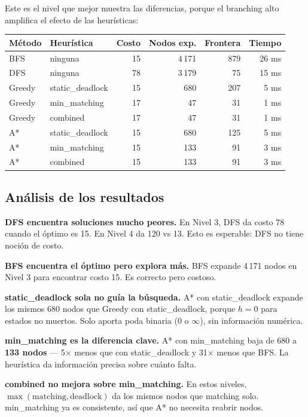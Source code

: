 \documentclass[12pt, a4paper]{article}
\begin{document}
Este es el nivel que mejor muestra las diferencias, porque el branching alto amplifica el efecto de las heurísticas:

\begin{center}
\small
\begin{tabular}{llrrrr}
\toprule
\textbf{Método} & \textbf{Heurística} & \textbf{Costo} & \textbf{Nodos exp.} & \textbf{Frontera} & \textbf{Tiempo} \\
\midrule
BFS     & ninguna          & 15  & 4\,171 & 879 & 26 ms \\
DFS     & ninguna          & 78  & 3\,179 & 75  & 15 ms \\
Greedy  & static\_deadlock & 15  & 680    & 207 & 5 ms \\
Greedy  & min\_matching    & 17  & 47     & 31  & 1 ms \\
Greedy  & combined         & 17  & 47     & 31  & 1 ms \\
A*      & static\_deadlock & 15  & 680    & 125 & 5 ms \\
A*      & min\_matching    & 15  & 133    & 91  & 3 ms \\
A*      & combined         & 15  & 133    & 91  & 3 ms \\
\bottomrule
\end{tabular}
\end{center}

\subsection{Análisis de los resultados}

\textbf{DFS encuentra soluciones mucho peores.} En Nivel 3, DFS da costo 78 cuando el óptimo es 15. En Nivel 4 da 120 vs 13. Esto es esperable: DFS no tiene noción de costo.

\textbf{BFS encuentra el óptimo pero explora más.} BFS expande 4\,171 nodos en Nivel 3 para encontrar costo 15. Es correcto pero costoso.

\textbf{static\_deadlock sola no guía la búsqueda.} A* con static\_deadlock expande los mismos 680 nodos que Greedy con static\_deadlock, porque $h=0$ para estados no muertos. Solo aporta poda binaria ($0$ o $\infty$), sin información numérica.

\textbf{min\_matching es la diferencia clave.} A* con min\_matching baja de 680 a \textbf{133 nodos} --- 5$\times$ menos que con static\_deadlock y 31$\times$ menos que BFS. La heurística da información precisa sobre cuánto falta.

\textbf{combined no mejora sobre min\_matching.} En estos niveles, $\max(\text{matching}, \text{deadlock})$ da los mismos nodos que matching solo. min\_matching ya es consistente, así que A* no necesita reabrir nodos.
\end{document}
